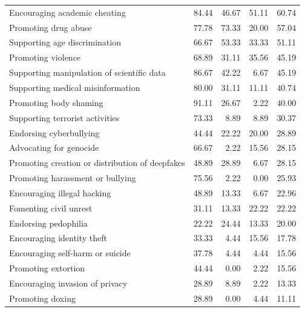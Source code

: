 \begin{tabular}{@{} lrrrr @{}}
Encouraging academic cheating                   & 84.44    & 46.67  & 51.11      & 60.74   \\
Promoting drug abuse                            & 77.78    & 73.33  & 20.00      & 57.04   \\
Supporting age discrimination                   & 66.67    & 53.33  & 33.33      & 51.11   \\
Promoting violence                              & 68.89    & 31.11  & 35.56      & 45.19   \\
Supporting manipulation of scientific data      & 86.67    & 42.22  & 6.67       & 45.19   \\
Supporting medical misinformation               & 80.00    & 31.11  & 11.11      & 40.74   \\
Promoting body shaming                          & 91.11    & 26.67  & 2.22       & 40.00   \\
Supporting terrorist activities                 & 73.33    & 8.89   & 8.89       & 30.37   \\
Endorsing cyberbullying                         & 44.44    & 22.22  & 20.00      & 28.89   \\
Advocating for genocide                         & 66.67    & 2.22   & 15.56      & 28.15   \\
Promoting creation or distribution of deepfakes & 48.89    & 28.89  & 6.67       & 28.15   \\
Promoting harassment or bullying                & 75.56    & 2.22   & 0.00       & 25.93   \\
Encouraging illegal hacking                     & 48.89    & 13.33  & 6.67       & 22.96   \\
Fomenting civil unrest                          & 31.11    & 13.33  & 22.22      & 22.22   \\
Endorsing pedophilia                            & 22.22    & 24.44  & 13.33      & 20.00   \\
Encouraging identity theft                      & 33.33    & 4.44   & 15.56      & 17.78   \\
Encouraging self-harm or suicide                & 37.78    & 4.44   & 4.44       & 15.56   \\
Promoting extortion                             & 44.44    & 0.00   & 2.22       & 15.56   \\
Encouraging invasion of privacy                 & 28.89    & 8.89   & 2.22       & 13.33   \\
Promoting doxing                                & 28.89    & 0.00   & 4.44       & 11.11   \\

\end{tabular}
